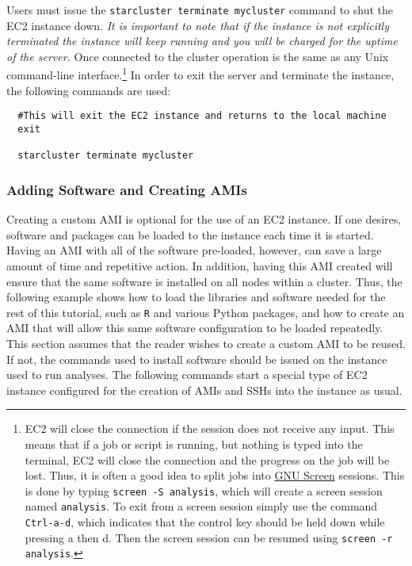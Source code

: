 \documentclass[12pt, letterpaper]{article}
\begin{document}
Users must issue the \texttt{starcluster terminate mycluster} 
command to shut the EC2 instance down. \emph{It is important to note that if the instance is not
explicitly terminated the instance will keep running and you will
be charged for the uptime of the server.}
Once connected to the cluster operation is the same as any Unix 
command-line interface.\footnote{EC2 will close the connection if the session 
does not receive any input. This means that if a job or script is running, but 
nothing is typed into the terminal, EC2 will close the connection and the 
progress on the job will be lost. Thus, it is often a good idea to split jobs 
into \href{https://www.gnu.org/software/screen/}{GNU Screen} sessions. This is done by typing \texttt{screen -S 
analysis}, which will create a screen session named \texttt{analysis}. To exit from a 
screen session simply use the command \texttt{Ctrl-a-d}, which indicates that the control key should be held 
down while pressing a then d. Then the screen session can be resumed 
using \texttt{screen -r analysis}.} In order to exit the server and terminate the instance,
the following commands are used:

\begin{verbatim}
  #This will exit the EC2 instance and returns to the local machine
  exit

  starcluster terminate mycluster
\end{verbatim}

\subsubsection*{Adding Software and Creating AMIs}

Creating a custom AMI is optional for the use of an EC2 instance. If one desires, software and packages 
can be loaded to the instance each time it is started. Having an AMI with all of the software pre-loaded, however, can save a 
large amount of time and repetitive action. In addition, having this AMI created will ensure that the same software is
installed on all nodes within a cluster. Thus, the following example shows how to load the libraries and 
software needed for the rest of this tutorial, such as \texttt{R} and various Python packages, 
and how to create an AMI that will allow this same software configuration to be loaded repeatedly. This section assumes
that the reader wishes to create a custom AMI to be reused. If not, the commands used to install software should be issued
on the instance used to run analyses. The following commands start a special type of EC2 instance 
configured for the creation of AMIs and SSHs into the instance as usual. 
\end{document}
